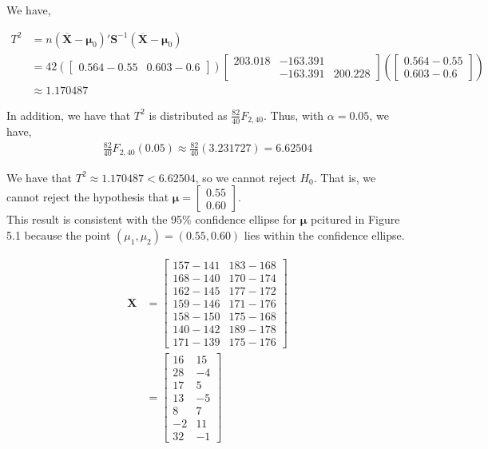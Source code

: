 \documentclass[12pt]{article}\usepackage[]{graphicx}\usepackage[]{color}
\newenvironment{problem}[2][Problem]{\begin{trivlist}
\item[\hskip \labelsep {\bfseries #1}\hskip \labelsep {\bfseries #2.}]}{\end{trivlist}}
\newcommand{\vct}{\mathbf}
\begin{document}
We have,

\begin{align*}
T^2 &= n(\vct{\overline{X}} - \vct{\mu}_0)'\vct{S}^{-1}(\vct{\overline{X}} - \vct{\mu}_0)\\
&= 42\left(\begin{bmatrix} 0.564-0.55 & 0.603-0.6 \end{bmatrix}\right) \begin{bmatrix} 203.018 & -163.391 \\ & -163.391 & 200.228 \end{bmatrix} \left(\begin{bmatrix} 0.564-0.55 \\ 0.603-0.6 \end{bmatrix}\right)\\
&\approx 1.170487
\end{align*}

In addition, we have that $T^2$ is distributed as $\frac{82}{40}F_{2, 40}$. Thus, with $\alpha = 0.05$, we have,
\begin{align*}
\frac{82}{40}F_{2, 40}(0.05) \approx \frac{82}{40}(3.231727) = 6.62504
\end{align*}

We have that $T^2 \approx 1.170487 < 6.62504$, so we cannot reject $H_0$. That is, we cannot reject the hypothesis that $\vct{\mu} = \begin{bmatrix} 0.55 \\ 0.60 \end{bmatrix}$.\\

This result is consistent with the 95\% confidence ellipse for $\vct{\mu}$ pcitured in Figure 5.1 because the point $(\mu_1, \mu_2) = (0.55, 0.60)$ lies within the confidence ellipse.


\begin{problem}{5.10(c)}
\end{problem}

\begin{align*}
\vct{X} &= \begin{bmatrix} 157 - 141 & 183 - 168 \\ 168 - 140 & 170 - 174 \\ 162 - 145 & 177 - 172 \\ 159 - 146 & 171 - 176 \\ 158 - 150 & 175 - 168 \\ 140 - 142 & 189 - 178 \\ 171 - 139 & 175 - 176 \end{bmatrix}\\
&= \begin{bmatrix} 16 & 15 \\ 28 & -4 \\ 17 & 5 \\ 13 & -5 \\ 8 & 7 \\ -2 & 11 \\ 32 & -1 \end{bmatrix}
\end{align*}
\end{document}
